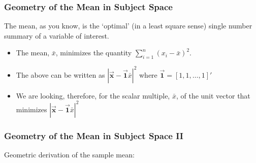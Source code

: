\documentclass{beamer}
\begin{document}
\begin{frame}
  \frametitle{Geometry of the Mean in Subject Space}

The mean, as you know, is the `optimal' (in a least square sense) single number summary of a variable of interest.

\begin{itemize}

\item The mean, $\bar{x}$, minimizes the quantity $\sum_{i=1}^{n}(x_i-\bar{x})^2$.

\item The above can be written as $|\vec{\mathbf{x}}-\vec{\mathbf{1}}\bar{x}|^2$ where $\vec{\mathbf{1}} = [1,1,\ldots,1]'$

\item We are looking, therefore, for the scalar multiple, $\bar{x}$, of the unit vector that minimizes $|\vec{\mathbf{x}}-\vec{\mathbf{1}}\bar{x}|^2$

\end{itemize}
\end{frame}

\begin{frame}
  \frametitle{Geometry of the Mean in Subject Space II}

Geometric derivation of the sample mean:

\begin{center}

\end{center}


\end{frame}
\end{document}
